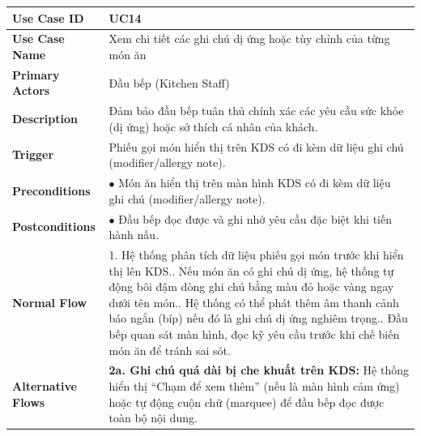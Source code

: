 \begin{longtable}{|L{3.5cm}|L{12.5cm}|}
\hline
\textbf{Use Case ID} & UC14 \\ \hline
\textbf{Use Case Name} & Xem chi tiết các ghi chú dị ứng hoặc tùy chỉnh của từng món ăn \\ \hline
\textbf{Primary Actors} & Đầu bếp (Kitchen Staff) \\ \hline
\textbf{Description} & Đảm bảo đầu bếp tuân thủ chính xác các yêu cầu sức khỏe (dị ứng) hoặc sở thích cá nhân của khách. \\ \hline
\textbf{Trigger} & Phiếu gọi món hiển thị trên KDS có đi kèm dữ liệu ghi chú (modifier/allergy note). \\ \hline
\textbf{Preconditions} & $\bullet$ Món ăn hiển thị trên màn hình KDS có đi kèm dữ liệu ghi chú (modifier/allergy note). \\ \hline
\textbf{Postconditions} & $\bullet$ Đầu bếp đọc được và ghi nhớ yêu cầu đặc biệt khi tiến hành nấu. \\ \hline
\textbf{Normal Flow} &
1. Hệ thống phân tích dữ liệu phiếu gọi món trước khi hiển thị lên KDS.. Nếu món ăn có ghi chú dị ứng, hệ thống tự động bôi đậm dòng ghi chú bằng màu đỏ hoặc vàng ngay dưới tên món.. Hệ thống có thể phát thêm âm thanh cảnh báo ngắn (bíp) nếu đó là ghi chú dị ứng nghiêm trọng.. Đầu bếp quan sát màn hình, đọc kỹ yêu cầu trước khi chế biến món ăn để tránh sai sót. \\ \hline
\textbf{Alternative Flows} &
\textbf{2a. Ghi chú quá dài bị che khuất trên KDS:} Hệ thống hiển thị ``Chạm để xem thêm'' (nếu là màn hình cảm ứng) hoặc tự động cuộn chữ (marquee) để đầu bếp đọc được toàn bộ nội dung. \\ \hline
\end{longtable}

